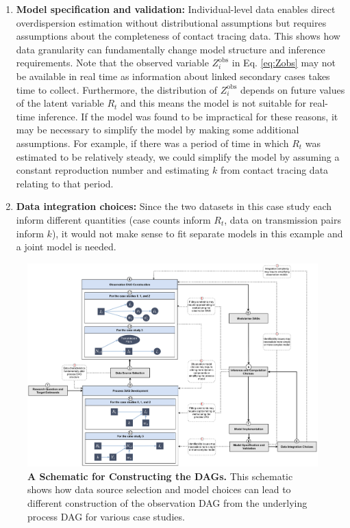 \documentclass{article}
\begin{document}
\begin{enumerate}
    \item \textbf{Model specification and validation:} Individual-level data enables direct overdispersion estimation without distributional assumptions but requires assumptions about the completeness of contact tracing data. This shows how data granularity can fundamentally change model structure and inference requirements. Note that the observed variable $Z^\mathrm{obs}_i$ in Eq. \eqref{eq:Zobs} may not be available in real time as information about linked secondary cases takes time to collect. Furthermore, the distribution of $Z^\mathrm{obs}_i$ depends on future values of the latent variable $R_t$ and this means the model is not suitable for real-time inference. If the model was found to be impractical for these reasons, it may be necessary to simplify the model by making some additional assumptions. For example, if there was a period of time in which $R_t$ was estimated to be relatively steady, we could simplify the model by assuming a constant reproduction number and estimating $k$ from contact tracing data relating to that period. 

    \item \textbf{Data integration choices:} Since the two datasets in this case study each inform different quantities (case counts inform $R_t$, data on transmission pairs inform $k$), it would not make sense to fit separate models in this example and a joint model is needed. 
\end{enumerate}




\begin{figure}[htbp]
    \centering
    \includegraphics[width=\textwidth]{figures/case_study_diagram.drawio.pdf}
    \caption{\textbf{A Schematic for Constructing the DAGs.} This schematic shows how data source selection and model choices can lead to different construction of the observation DAG from the underlying process DAG for various case studies.}
    \label{fig:case_study_diagram}
\end{figure}
\end{document}

